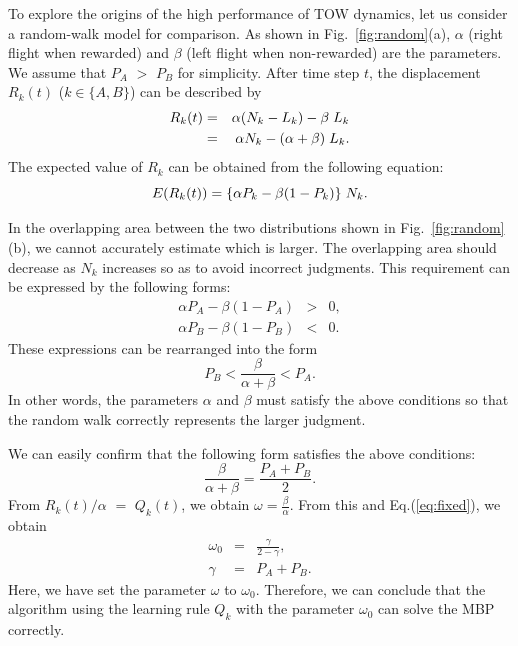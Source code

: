 \documentclass[twocolumn,showpacs,preprintnumbers,amsmath,amssymb]{revtex4}
\begin{document}
To explore the origins of the high performance of TOW dynamics, let us consider a random-walk model for comparison.
As shown in Fig.~\ref{fig:random}(a), $\alpha$ (right flight when rewarded) and $\beta$ (left flight when non-rewarded) are the parameters.
We assume that $P_A$ $>$ $P_B$ for simplicity. 
After time step $t$, the displacement $R_k(t)$ ($k\in \{A,B\}$) can be described by
\begin{eqnarray}
R_k(t) & = & \alpha (N_k - L_k) - \beta \hspace{1mm}L_k  \nonumber \\
       & = & \alpha N_k - (\alpha + \beta)\hspace{1mm}L_k . \label{eq:ran}
\end{eqnarray}
The expected value of $R_k$ can be obtained from the following equation:
\begin{equation}
E( R_k(t) ) = \{\alpha P_k - \beta (1 - P_k)\}\hspace{1mm} N_k .
\end{equation}

In the overlapping area between the two distributions shown in Fig.~\ref{fig:random}(b), we cannot accurately estimate which is larger.
The overlapping area should decrease as $N_k$ increases so as to avoid incorrect judgments.  
This requirement can be expressed by the following forms:
\begin{eqnarray}
  \alpha P_A - \beta (1 - P_A)     & > & 0 ,  \\
  \alpha P_B - \beta (1 - P_B)     & < & 0 . \label{eq:cond1}
\end{eqnarray}
These expressions can be rearranged into the form  
\begin{equation}
P_B  < \frac{\beta}{\alpha + \beta}   < P_A .  \label{eq:cond1}
\end{equation}
In other words, the parameters $\alpha$ and $\beta$ must satisfy the above conditions so that the random walk correctly represents the larger judgment. 


We can easily confirm that the following form satisfies the above conditions:
\begin{equation}
\frac{\beta}{\alpha + \beta}   = \frac{P_A + P_B}{2} .\label{eq:fixed}
\end{equation}
From $R_k(t)/\alpha $ $=$ $Q_k(t)$, we obtain $\omega = \frac{\beta}{\alpha}$. 
From this and Eq.(\ref{eq:fixed}), we obtain
\begin{eqnarray}
\omega_0 & = & \frac{\gamma}{2 - \gamma} , \label{eq:w0}\\
\gamma & = & P_A + P_B .
\end{eqnarray}
Here, we have set the parameter $\omega$ to $\omega_0$.
Therefore, we can conclude that the algorithm using the learning rule $Q_k$ with the parameter $\omega_0$ can solve the MBP correctly.
\end{document}
